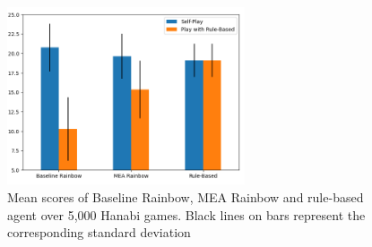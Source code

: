 \documentclass[letterpaper]{article} %
\begin{document}





    \begin{figure}[t]
    \centering
    \includegraphics[width=7.0cm]{bar plot.png}
    \caption{Mean scores of Baseline Rainbow, MEA Rainbow and rule-based agent over 5,000 Hanabi games. Black lines on bars represent the corresponding standard deviation}
    \label{fig:bar_plot}
\end{figure}


\end{document}

